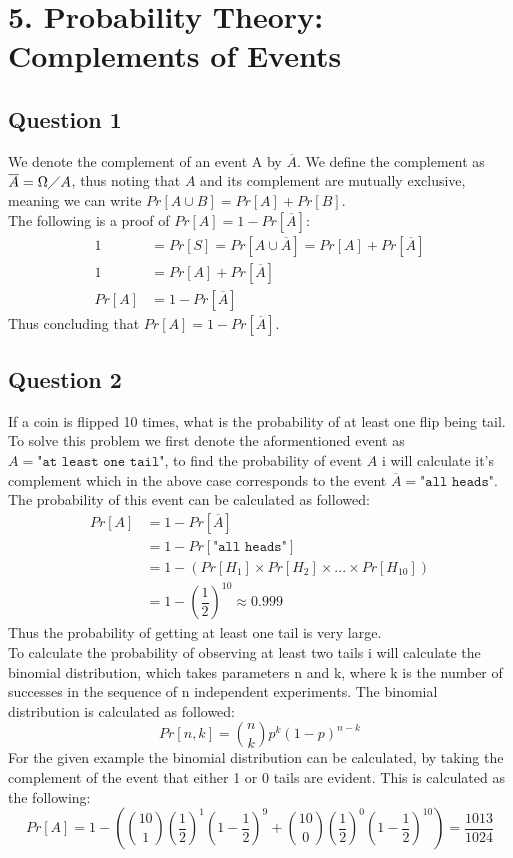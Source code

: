 \documentclass{article}
\begin{document}
\section{5. Probability Theory: Complements of Events}
\subsection{Question 1}
We denote the complement of an event A by $\overline{A}$. We define the complement as $\overline{A} = \Omega \diagup A$, thus noting that $A$ and its complement are mutually exclusive, meaning we can write $Pr[A\cup B] = Pr[A] + Pr[B]$. \\
The following is a proof of $Pr[A] = 1 - Pr[\overline{A}]$:
\begin{align*}
1 &= Pr[S] = Pr[A \cup \overline{A}] = Pr[A]+ Pr[\overline{A}] \\
1 &= Pr[A]+ Pr[\overline{A}] \\
Pr[A] &= 1 - Pr[\overline{A}]
\end{align*}
Thus concluding that $Pr[A] = 1 - Pr[\overline{A}]$.
\subsection{Question 2}
If a coin is flipped 10 times, what is the probability of at least one flip being tail. To solve this problem we first denote the aformentioned event as $A = \texttt{"at least one tail"}$, to find the probability of event $A$ i will calculate it's complement which in the above case corresponds to the event $\overline{A} = \texttt{"all heads"}$. The probability of this event can be calculated as followed:
\begin{align}
Pr[A] &= 1-Pr[\overline{A}] \\
&= 1-Pr[\texttt{"all heads"}] \\
&= 1 - \left( Pr[H_1] \times Pr[H_2] \times ... \times Pr[H_{10}] \right) \\
&= 1 - \left( \dfrac{1}{2} \right)^{10} \approx 0.999
\end{align}
Thus the probability of getting at least one tail is very large. \\
To calculate the probability of observing at least two tails i will calculate the binomial distribution, which takes parameters n and k, where k is the number of successes in the sequence of n independent experiments. The binomial distribution is calculated as followed:
$$
Pr[n,k] = \binom{n}{k}p^k(1-p)^{n-k}
$$
For the given example the binomial distribution can be calculated, by taking the complement of the event that either 1 or 0 tails are evident. This is calculated as the following:
$$
Pr[A] = 1 - \left( \binom{10}{1} \left(\frac{1}{2}\right)^1\left(1-\frac{1}{2}\right)^9 +
 \binom{10}{0} \left(\frac{1}{2}\right)^0\left(1-\frac{1}{2}\right)^{10} \right)
= \frac{1013}{1024}
$$
\end{document}
